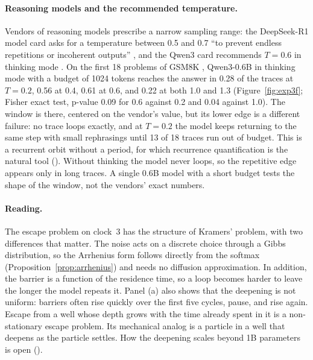 \paragraph{Reasoning models and the recommended temperature.} Vendors of reasoning models prescribe a narrow sampling range: the DeepSeek-R1 model card asks for a temperature between 0.5 and 0.7 ``to prevent endless repetitions or incoherent outputs'' \citep{deepseekr1card,guo2025deepseekr1}, and the Qwen3 card recommends $T=0.6$ in thinking mode \citep{qwen3card,yang2025qwen3}. On the first 18 problems of GSM8K \citep{cobbe2021training}, Qwen3-0.6B in thinking mode with a budget of 1024 tokens reaches the answer in 0.28 of the traces at $T=0.2$, 0.56 at 0.4, 0.61 at 0.6, and 0.22 at both 1.0 and 1.3 (Figure~\ref{fig:exp3f}; Fisher exact test, p-value 0.09 for 0.6 against 0.2 and 0.04 against 1.0). The window is there, centered on the vendor's value, but its lower edge is a different failure: no trace loops exactly, and at $T=0.2$ the model keeps returning to the same step with small rephrasings until 13 of 18 traces run out of budget. This is a recurrent orbit without a period, for which recurrence quantification \citep{eckmann1987recurrence,marwan2007recurrence} is the natural tool (). Without thinking the model never loops, so the repetitive edge appears only in long traces. A single 0.6B model with a short budget tests the shape of the window, not the vendors' exact numbers.

\paragraph{Reading.} The escape problem on clock~3 has the structure of Kramers' problem, with two differences that matter. The noise acts on a discrete choice through a Gibbs distribution, so the Arrhenius form follows directly from the softmax (Proposition~\ref{prop:arrhenius}) and needs no diffusion approximation. In addition, the barrier is a function of the residence time, so a loop becomes harder to leave the longer the model repeats it. Panel (a) also shows that the deepening is not uniform: barriers often rise quickly over the first five cycles, pause, and rise again. Escape from a well whose depth grows with the time already spent in it is a non-stationary escape problem. Its mechanical analog is a particle in a well that deepens as the particle settles. How the deepening scales beyond 1B parameters is open ().

